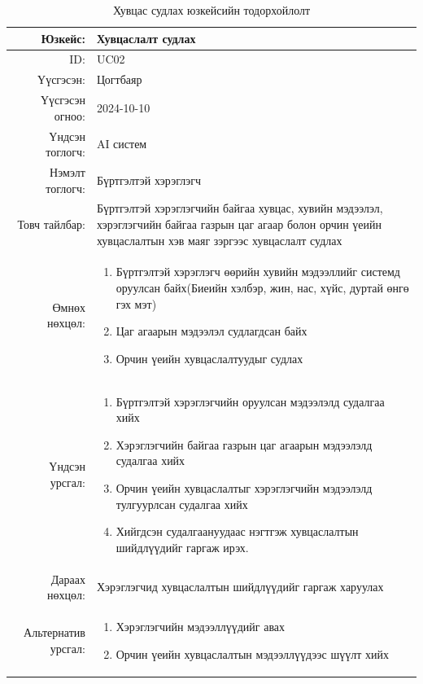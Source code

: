 \begin{longtable}{|r|p{11.5cm}|}
    \caption{Хувцас судлах юзкейсийн тодорхойлолт} 
    \label{table:songolt2}\\ \hline
    {Юзкейс:} & {Хувцаслалт судлах}\\ \hline
    {ID:} & {UC02}\\ \hline
    {Үүсгэсэн:} & {Цогтбаяр}\\ \hline
    {Үүсгэсэн огноо:} & {2024-10-10}\\ \hline
    {Үндсэн тоглогч:} & {AI систем}\\ \hline
    {Нэмэлт тоглогч:} & {Бүртгэлтэй хэрэглэгч}\\ \hline
    {Товч тайлбар:} & {Бүртгэлтэй хэрэглэгчийн байгаа хувцас, хувийн мэдээлэл, хэрэглэгчийн байгаа газрын цаг агаар болон орчин үеийн хувцаслалтын хэв маяг зэргээс хувцаслалт судлах}\\ \hline
    {Өмнөх нөхцөл:} & {\begin{enumerate}
        \item Бүртгэлтэй хэрэглэгч өөрийн хувийн мэдээллийг системд оруулсан байх(Биеийн хэлбэр, жин, нас, хүйс, дуртай өнгө гэх мэт)
        \item Цаг агаарын мэдээлэл судлагдсан байх
        \item Орчин үеийн хувцаслалтуудыг судлах
    \end{enumerate}}\\ \hline
    {Үндсэн урсгал:} & {\begin{enumerate}    
        \item Бүртгэлтэй хэрэглэгчийн оруулсан мэдээлэлд судалгаа хийх
    \item Хэрэглэгчийн байгаа газрын цаг агаарын мэдээлэлд судалгаа хийх
    \item Орчин үеийн хувцаслалтыг хэрэглэгчийн мэдээлэлд тулгуурлсан судалгаа хийх
    \item Хийгдсэн судалгаануудаас нэгтгэж хувцаслалтын шийдлүүдийг гаргаж ирэх.\end{enumerate}}\\ \hline
    {Дараах нөхцөл:} & {Хэрэглэгчид хувцаслалтын шийдлүүдийг гаргаж харуулах}\\ \hline
    {Альтернатив урсгал:} & {\begin{enumerate}
        \item Хэрэглэгчийн мэдээллүүдийг авах
        \item Орчин үеийн хувцаслалтын мэдээллүүдээс шүүлт хийх
    \end{enumerate}}\\ \hline
\end{longtable}
